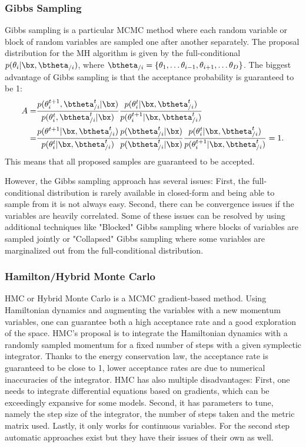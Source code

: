 \subsubsection{Gibbs Sampling}

Gibbs sampling is a particular \ac{MCMC} method where each random variable or block of random variables are sampled one after another separately.
The proposal distribution for the \ac{MH} algorithm is given by the full-conditional  $p(\theta_i|\bx,\btheta_{/i})$, where $\btheta_{/i}=\{\theta_1, \ldots \theta_{i-1}, \theta_{i+1},\ldots \theta_{D}\}$.
The biggest advantage of Gibbs sampling is that the acceptance probability is guaranteed to be 1:
\begin{align*}
    A =& \frac{p(\theta^{t+1}_i,\btheta^t_{/i}|\bx)}{p(\theta^t_i,\btheta^t_{/i}|\bx)}\frac{p(\theta^t_i|\bx,\btheta^{t}_{/i})}{p(\theta^{t+1}_i|\bx,\btheta^t_{/i})}\\
    =& \frac{p(\theta^{t+1}|\bx, \btheta^{t}_{/i})}{p(\theta^t_i|\bx,\btheta^t_{/i})}\frac{p(\btheta^t_{/i}|\bx)}{p(\btheta^t_{/i}|\bx)}\frac{p(\theta^t_i|\bx,\btheta^{t}_{/i})}{p(\theta^{t+1}_i|\bx,\btheta^t_{/i})} = 1.
\end{align*}
This means that all proposed samples are guaranteed to be accepted.

However, the Gibbs sampling approach has several issues:
First, the full-conditional distribution is rarely available in closed-form and being able to sample from it is not always easy.
Second, there can be convergence issues if the variables are heavily correlated.
Some of these issues can be resolved by using additional techniques like "Blocked" Gibbs sampling \needcite where blocks of variables are sampled jointly or "Collapsed" Gibbs sampling \needcite where some variables are marginalized out from the full-conditional distribution.

\subsubsection{Hamilton/Hybrid Monte Carlo}

\acf{HMC} or Hybrid Monte Carlo \cite{betancourt2017conceptual} is a \ac{MCMC} gradient-based method.
Using Hamiltonian dynamics and augmenting the variables with a new momentum variables, one can guarantee both a high acceptance rate and a good exploration of the space.
\ac{HMC}'s proposal is to integrate the Hamiltonian dynamics with a randomly sampled momentum for a fixed number of steps with a given symplectic integrator.
Thanks to the energy conservation law, the acceptance rate is guaranteed to be close to 1, lower acceptance rates are due to numerical inaccuracies of the integrator.
\ac{HMC} has also multiple disadvantages: 
First, one needs to integrate differential equations based on gradients, which can be exceedingly expansive for some models.
Second, it has parameters to tune, namely the step size of the integrator, the number of steps taken and the metric matrix used.
Lastly, it only works for continuous variables.
For the second step automatic approaches exist but they have their issues of their own as well.


